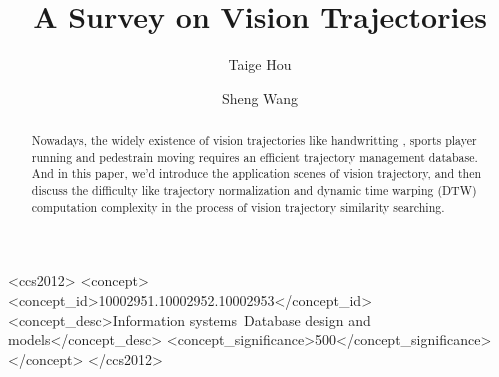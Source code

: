 \documentclass[sigconf]{acmart}
\begin{document}
\title{A Survey on Vision Trajectories}




\author{Taige Hou}

\author{Sheng Wang}


\begin{abstract}
Nowadays, the widely existence of vision trajectories like handwritting \cite{VikramLR13}, sports player running\cite{DBLP:conf/kdd/WangLCJ19} and pedestrain moving \cite{GuptaJFSA18} requires an efficient trajectory management database. And in this paper, we'd introduce the application scenes of vision trajectory, and then discuss the difficulty like trajectory normalization and dynamic time warping (DTW) computation complexity \cite{RakthanmanonDTW} in the process of vision trajectory similarity searching.   
\end{abstract}

\begin{CCSXML}
	<ccs2012>
	<concept>
	<concept_id>10002951.10002952.10002953</concept_id>
	<concept_desc>Information systems~Database design and models</concept_desc>
	<concept_significance>500</concept_significance>
	</concept>
	</ccs2012>
\end{CCSXML}

\end{document}
